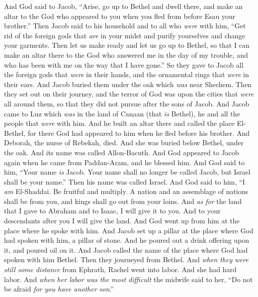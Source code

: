 \begin{biblechapter} %
 And God said to Jacob, “Arise, go up to Bethel and dwell there, and make an altar to the God who appeared to you when you fled from before Esau your brother.”
\verse Then Jacob said to his household and to all who \textit{were} with him, “Get rid of the foreign gods that \textit{are} in your midst and purify yourselves and change your garments.
\verse Then let us make ready and let us go up to Bethel, so that I can make an altar there to the God who answered me in the day of my trouble, and who has been with me on the way that I have gone.”
\verse So they gave to Jacob all the foreign gods that \textit{were} in their hands, and the ornamental rings that \textit{were} in their ears. And Jacob buried them under the oak which \textit{was} near Shechem.
\verse Then they set out on their journey, and the terror of God was upon the cities that \textit{were} all around them, so that they did not pursue after the sons of Jacob.
\verse And Jacob came to Luz which \textit{was} in the land of Canaan (that \textit{is} Bethel), he and all the people that \textit{were} with him.
\verse And he built an altar there and called the place El-Bethel, for there God had appeared to him when he fled before his brother.
\verse And Deborah, the nurse of Rebekah, died. And she was buried below Bethel, under the oak. And its name was called Allon-Bacuth.
\verse And God appeared to Jacob again when he came from Paddan-Aram, and he blessed him.
\verse And God said to him, “Your name \textit{is} Jacob. Your name shall no longer be called Jacob, but Israel shall be your name.” Then his name was called Israel.
\verse And God said to him, “I \textit{am} El-Shaddai. Be fruitful and multiply. A nation and an assemblage of nations shall be from you, and kings shall go out from your loins.
\verse And \textit{as for} the land that I gave to Abraham and to Isaac, I will give it to you. And to your descendants after you I will give the land.
\verse And God went up from him at the place where he spoke with him.
\verse And Jacob set up a pillar at the place where God had spoken with him, a pillar of stone. And he poured out a drink offering upon it, and poured oil on it.
\verse And Jacob called the name of the place where God had spoken with him Bethel.
 Then they journeyed from Bethel. And \textit{when they were still some distance} from Ephrath, Rachel went into labor. And she had hard labor.
\verse And \textit{when her labor was the most difficult} the midwife said to her, “Do not be afraid \textit{for you have another son}.”

\end{biblechapter}

